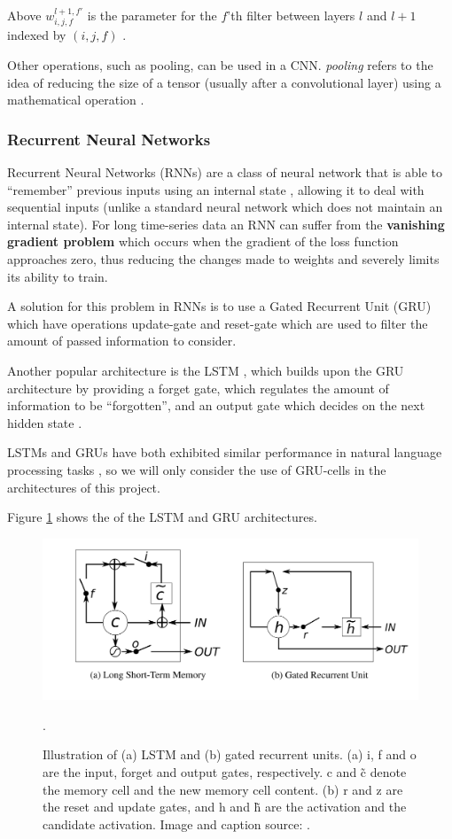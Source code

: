  Above $w^{l+1,f'}_{i,j,f}$ is the parameter for the $f$'th filter between layers $l$ and $l+1$ indexed by $(i,j,f)$ \cite{csmlnotes}.
 
 
 
Other operations, such as pooling, can be used in a CNN. \textit{pooling} refers to the idea of reducing the size of a tensor (usually after a convolutional layer) using a mathematical operation \cite{cnn}.

\subsubsection{Recurrent Neural Networks}
Recurrent Neural Networks (RNNs) are a class of neural network that is able to ``remember'' previous inputs using an internal state \cite{rnn}, allowing it to deal with sequential inputs (unlike a standard neural network which does not maintain an internal state). For long time-series data an RNN can suffer from the \textbf{vanishing gradient problem} \cite{rnn} which occurs when the gradient of the loss function approaches zero, thus reducing the changes made to weights and severely limits its ability to train. 

A solution for this problem in RNNs is to use a Gated Recurrent Unit (GRU) \cite{gru} which have operations update-gate and reset-gate which are used to filter the amount of passed information to consider. 

Another popular architecture is the LSTM \cite{lstm}, which builds upon the GRU architecture by providing a forget gate, which regulates the amount of information to be ``forgotten'', and an output gate which decides on the next hidden state \cite{lstm}.

LSTMs and GRUs have both exhibited similar performance in natural language processing tasks \cite{lstmvsgru}, so we will only consider the use of GRU-cells in the architectures of this project.

Figure \ref{fig:rnn} shows the of the LSTM and GRU architectures.

\begin{figure}
    \centering
    \includegraphics[scale = 0.2]{images/rnn.png}
    \caption{Illustration of (a) LSTM and (b) gated recurrent units. (a) i, f and o are the input, forget and output gates, respectively. c and \~c denote the memory cell and the new memory cell content. (b) r and z are the reset and update gates, and h and \~h are the activation and the candidate activation. Image and caption source: \cite{rnn}.}.
    \label{fig:rnn}
\end{figure}

